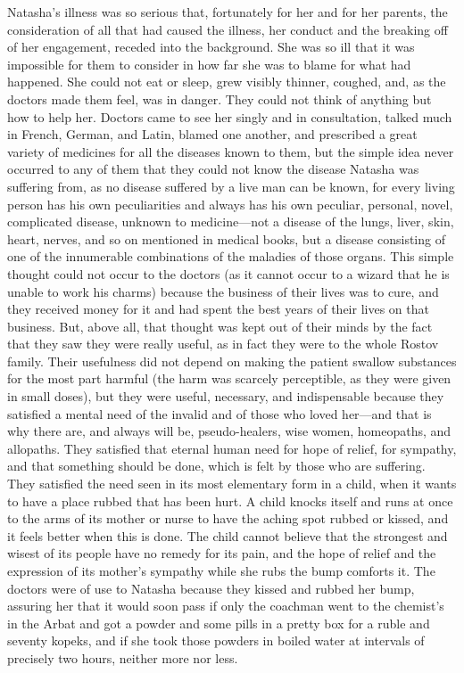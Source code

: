 Natasha's illness was so serious that, fortunately for her and
for her parents, the consideration of all that had caused the
illness, her conduct and the breaking off of her engagement,
receded into the background. She was so ill that it was
impossible for them to consider in how far she was to blame for
what had happened. She could not eat or sleep, grew visibly
thinner, coughed, and, as the doctors made them feel, was in
danger. They could not think of anything but how to help
her. Doctors came to see her singly and in consultation, talked
much in French, German, and Latin, blamed one another, and
prescribed a great variety of medicines for all the diseases
known to them, but the simple idea never occurred to any of them
that they could not know the disease Natasha was suffering from,
as no disease suffered by a live man can be known, for every
living person has his own peculiarities and always has his own
peculiar, personal, novel, complicated disease, unknown to
medicine---not a disease of the lungs, liver, skin, heart,
nerves, and so on mentioned in medical books, but a disease
consisting of one of the innumerable combinations of the maladies
of those organs. This simple thought could not occur to the
doctors (as it cannot occur to a wizard that he is unable to work
his charms) because the business of their lives was to cure, and
they received money for it and had spent the best years of their
lives on that business. But, above all, that thought was kept out
of their minds by the fact that they saw they were really useful,
as in fact they were to the whole Rostov family. Their usefulness
did not depend on making the patient swallow substances for the
most part harmful (the harm was scarcely perceptible, as they
were given in small doses), but they were useful, necessary, and
indispensable because they satisfied a mental need of the invalid
and of those who loved her---and that is why there are, and
always will be, pseudo-healers, wise women, homeopaths, and
allopaths. They satisfied that eternal human need for hope of
relief, for sympathy, and that something should be done, which is
felt by those who are suffering. They satisfied the need seen in
its most elementary form in a child, when it wants to have a
place rubbed that has been hurt. A child knocks itself and runs
at once to the arms of its mother or nurse to have the aching
spot rubbed or kissed, and it feels better when this is done. The
child cannot believe that the strongest and wisest of its people
have no remedy for its pain, and the hope of relief and the
expression of its mother's sympathy while she rubs the bump
comforts it. The doctors were of use to Natasha because they
kissed and rubbed her bump, assuring her that it would soon pass
if only the coachman went to the chemist's in the Arbat and got a
powder and some pills in a pretty box for a ruble and seventy
kopeks, and if she took those powders in boiled water at
intervals of precisely two hours, neither more nor less.

